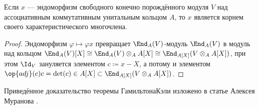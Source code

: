 \documentclass[
	extrafontsizes,
	11pt,
	hyphens,
]{memoir}
\begin{document}
%

\begin{theorem}
\label{thm:Cayley-Hamilton}
Если \(x\) --- эндоморфизм свободного конечно порождённого модуля \(V\) над ассоциативным коммутативным унитальным кольцом \(A\), то \(x\) является корнем своего характеристического многочлена.
\end{theorem}

\begin{proof}%
Эндоморфизм \(\varphi \mapsto \varphi x\) превращает \(\End_A(V)\)-модуль \(\End_A(V)\) в модуль над кольцом \(\End_A(V)[X] \cong \End_A(V) \otimes_A A[X] \cong \End_{A[X]}(V \otimes_A A[X])\),
при этом \(\Id_V\) зануляется элементом \(c \coloneqq x - X\), а потому и элементом \(\op{adj}(c) c = \det(c) \in A[X] \subset \End_{A[X]}(V \otimes_A A[X])\).
\end{proof}

\begin{remark}
Приведённое доказательство теоремы Гамильтона\namedash{}Кэли изложено в статье Алексея Муранова \cite{Muranov_2022}.
\end{remark}
\end{document}
